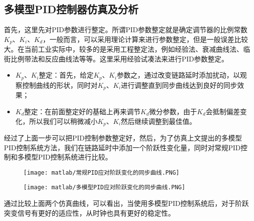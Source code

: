 \subsection{多模型PID控制器仿真及分析}
首先，这里先对PID参数进行整定。所谓PID参数整定就是确定调节器的比例常数$K_{p}$、$K_{i}$、$K_{d}$，一般而言，可以采用理论计算来进行参数整定，但是一般误差比较大。在当前工业实际中，较多的是采用工程整定法，例如经验法、衰减曲线法、临街比例带法和反应曲线法等等。这里采用经验试凑法来进行PID参数整定。
\begin{itemize}[noitemsep,topsep=0pt,parsep=0pt,partopsep=0pt]
  \item $K_{p}$、$K_{i}$整定：首先，给定$K_{p}$、$K_{i}$参数之，通过改变链路延时添加扰动，以观察控制曲线的形状，同时对$K_{p}$、$K_{i}$进行调整直到同步曲线达到良好的同步效果；
  \item $K_{d}$整定：在前面整定好的基础上再来调节$K_{d}$微分参数，由于$K_{d}$会抵制偏差变化，所以我们可以稍微减小$K_{p}$、$K_{i}$然后继续调整到最佳值。
\end{itemize}

经过了上面一步可以把PID控制参数整定好，然后，为了仿真上文提出的多模型PID控制系统方法，我们在链路延时中添加一个阶跃性变化量，同时对常规PID控制和多模型PID控制系统进行比较。

\begin{figure}[htbp]
  \centering
  \begin{minipage}[b]{0.7\textwidth}
   \captionstyle{\centering}
   \centering
   \texttt{[image: matlab/常规PID应对阶跃变化的同步曲线.PNG]}
  \end{minipage}     
\end{figure}

\begin{figure}[htbp]
  \centering
  \begin{minipage}[b]{0.7\textwidth}
   \captionstyle{\centering}
   \centering
   \texttt{[image: matlab/多模型PID应对阶跃变化的同步曲线.PNG]}
  \end{minipage}     
\end{figure}

通过比较上面两个仿真曲线，可以看出，当使用多模型PID控制系统后，对于阶跃突变信号有更好的适应性，从时钟也具有更好的稳定性。

